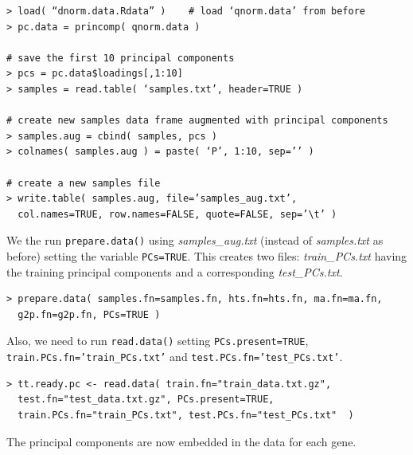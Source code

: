 \documentclass[a4paper,12pt]{article}
\begin{document}
\begin{verbatim}
> load( “dnorm.data.Rdata” )	# load ‘qnorm.data’ from before
> pc.data = princomp( qnorm.data )

# save the first 10 principal components
> pcs = pc.data$loadings[,1:10]
> samples = read.table( ‘samples.txt’, header=TRUE )

# create new samples data frame augmented with principal components
> samples.aug = cbind( samples, pcs )
> colnames( samples.aug ) = paste( ‘P’, 1:10, sep=’’ )

# create a new samples file
> write.table( samples.aug, file=’samples_aug.txt’, 
  col.names=TRUE, row.names=FALSE, quote=FALSE, sep=’\t’ )
\end{verbatim}

We the run \texttt{prepare.data()} using \textit{samples\_aug.txt} (instead of \textit{samples.txt} as before) setting the variable \texttt{PCs=TRUE}. This creates two files: \textit{train\_PCs.txt} having the training principal components and a corresponding \textit{test\_PCs.txt}.

\begin{verbatim}
> prepare.data( samples.fn=samples.fn, hts.fn=hts.fn, ma.fn=ma.fn, 
  g2p.fn=g2p.fn, PCs=TRUE )
\end{verbatim} 

Also, we need to run \texttt{read.data()} setting \texttt{PCs.present=TRUE},\\ \texttt{train.PCs.fn='train\_PCs.txt'} and \texttt{test.PCs.fn='test\_PCs.txt'}.

\begin{verbatim}
> tt.ready.pc <- read.data( train.fn="train_data.txt.gz", 
  test.fn="test_data.txt.gz", PCs.present=TRUE, 
  train.PCs.fn="train_PCs.txt", test.PCs.fn="test_PCs.txt"  )
\end{verbatim} 

The principal components are now embedded in the data for each gene.

% 
% 
% 
\end{document}
